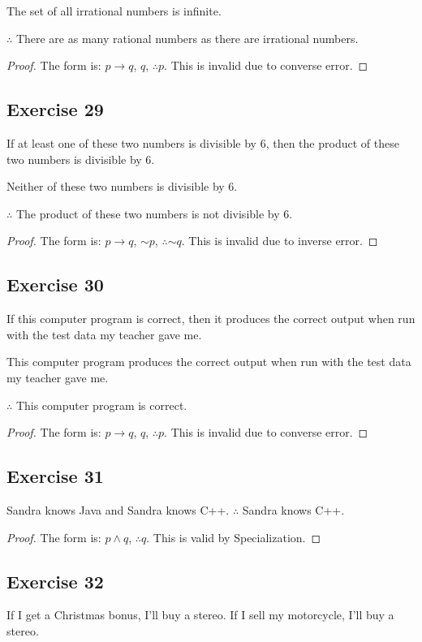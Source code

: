 \documentclass[14pt]{extarticle}
\begin{document}
The set of all irrational numbers is infinite.

$\therefore$ There are as many rational numbers as there are irrational numbers.
\begin{proof} The form is: $p \to q$, $q$, $\therefore p$. This is invalid due
to converse error. \end{proof}

\subsection{Exercise 29} If at least one of these two numbers is divisible by 6,
then the product of these two numbers is divisible by 6.

Neither of these two numbers is divisible by 6.

$\therefore$ The product of these two numbers is not divisible by 6.

\begin{proof} The form is: $p \to q$, ${\sim p}$, $\therefore {\sim q}$. This is
invalid due to inverse error. \end{proof}

\subsection{Exercise 30} If this computer program is correct, then it produces
the correct output when run with the test data my teacher gave me.

This computer program produces the correct output when run with the test data my
teacher gave me.

$\therefore$ This computer program is correct.

\begin{proof} The form is: $p \to q$, $q$, $\therefore p$. This is invalid due
to converse error. \end{proof}

\subsection{Exercise 31} Sandra knows Java and Sandra knows C++.
$\therefore$ Sandra knows C++.

\begin{proof} The form is: $p \wedge q$, $\therefore q$. This is valid by
Specialization. \end{proof}

\subsection{Exercise 32} If I get a Christmas bonus, I’ll buy a stereo.
If I sell my motorcycle, I’ll buy a stereo.
\end{document}
